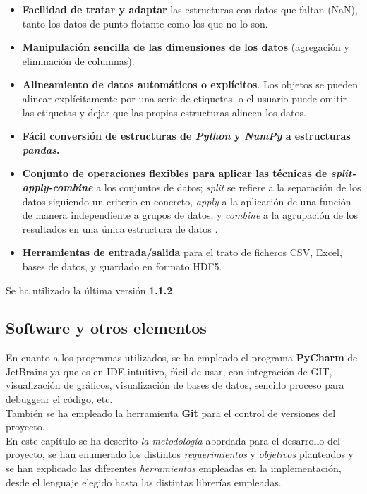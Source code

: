 \begin{itemize}
    \begin{itemize}
    \item \textbf{Facilidad de tratar y adaptar} las estructuras con datos que faltan (NaN), tanto los datos de punto flotante como los que no lo son. 
    \item \textbf{Manipulación sencilla de las dimensiones de los datos} (agregación y eliminación de columnas).
    \item \textbf{Alineamiento de datos automáticos o explícitos}. Los objetos se pueden alinear explícitamente por una serie de etiquetas, o el usuario puede omitir las etiquetas y dejar que las propias estructuras alineen los datos. 
    \item \textbf{Fácil conversión de estructuras de \textit{Python} y \textit{NumPy} a estructuras \textit{pandas}.}
    \item \textbf{Conjunto de operaciones flexibles para aplicar las técnicas de \textit{split-apply-combine}} a los conjuntos de datos; \textit{split} se refiere a la separación de los datos siguiendo un criterio en concreto, \textit{apply} a la aplicación de una función de manera independiente a grupos de datos, y \textit{combine} a la agrupación de los resultados en una única estructura de datos \cite{pandasSplitApplyCombine}.
    \item \textbf{Herramientas de entrada/salida} para el trato de ficheros CSV, Excel, bases de datos, y guardado en formato HDF5. 
\end{itemize}

    Se ha utilizado la última versión \textbf{1.1.2}.

\end{itemize}

\subsection{Software y otros elementos} 

En cuanto a los programas utilizados, se ha empleado el programa \textbf{PyCharm} de JetBrains ya que es en IDE intuitivo, fácil de usar, con integración de GIT, visualización de gráficos, visualización de bases de datos, sencillo proceso para debuggear el código, etc. \\

También se ha empleado la herramienta \textbf{Git} para el control de versiones del proyecto. \\


En este capítulo se ha descrito \textit{la metodología} abordada para el desarrollo del proyecto, se han enumerado los distintos \textit{requerimientos } y \textit{objetivos} planteados y se han explicado las diferentes \textit{herramientas} empleadas en la implementación, desde el lenguaje elegido hasta las distintas librerías empleadas. 